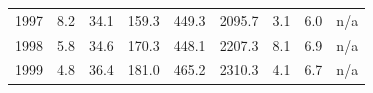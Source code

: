 \documentclass[openany]{book}
\begin{document}
\begin{table}[htbp]
{\begin{tabular}{ccccccccc}
\rowcolor[HTML]{F8F9FA} 
{\color[HTML]{202122} 1997}        & {\color[HTML]{202122} 8.2}                                                                  & {\color[HTML]{202122} 34.1}                                                                         & {\color[HTML]{202122} 159.3}                                                                    & {\color[HTML]{202122} 449.3}                                                                               & {\color[HTML]{202122} 2095.7}                                                                          & {\color[HTML]{202122} 3.1}                                                                            & {\color[HTML]{202122} 6.0}                                                                               & {\color[HTML]{202122} n/a}                                                                               \\
\rowcolor[HTML]{F8F9FA} 
{\color[HTML]{202122} 1998}        & {\color[HTML]{202122} 5.8}                                                                  & {\color[HTML]{202122} 34.6}                                                                         & {\color[HTML]{202122} 170.3}                                                                    & {\color[HTML]{202122} 448.1}                                                                               & {\color[HTML]{202122} 2207.3}                                                                          & {\color[HTML]{202122} 8.1}                                                                            & {\color[HTML]{202122} 6.9}                                                                               & {\color[HTML]{202122} n/a}                                                                               \\
\rowcolor[HTML]{F8F9FA} 
{\color[HTML]{202122} 1999}        & {\color[HTML]{202122} 4.8}                                                                  & {\color[HTML]{202122} 36.4}                                                                         & {\color[HTML]{202122} 181.0}                                                                    & {\color[HTML]{202122} 465.2}                                                                               & {\color[HTML]{202122} 2310.3}                                                                          & {\color[HTML]{202122} 4.1}                                                                            & {\color[HTML]{202122} 6.7}                                                                               & {\color[HTML]{202122} n/a}                                                                               \\

\end{tabular}}
\end{table}
\end{document}
